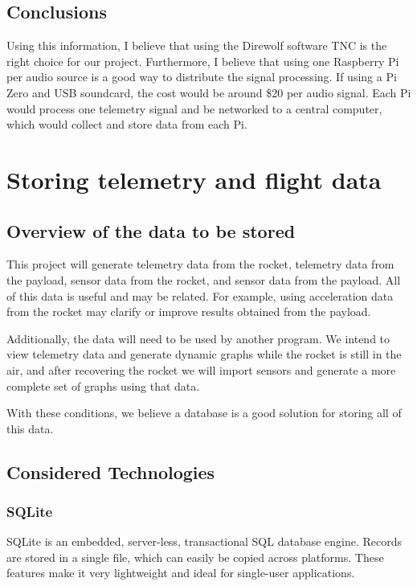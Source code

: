 \documentclass[onecolumn, draftclsnofoot, 10pt, compsoc]{IEEEtran}
\begin{document}
\subsection{Conclusions}
Using this information, I believe that using the Direwolf software TNC is the right choice for our project. Furthermore, I believe that using one Raspberry Pi per audio source is a good way to distribute the signal processing.  If using a Pi Zero and USB soundcard, the cost would be around \$20 per audio signal.  Each Pi would process one telemetry signal and be networked to a central computer, which would collect and store data from each Pi.

\section{Storing telemetry and flight data}

\subsection{Overview of the data to be stored}
This project will generate telemetry data from the rocket, telemetry data from the payload, sensor data from the rocket, and sensor data from the payload.  All of this data is useful and may be related.  For example, using acceleration data from the rocket may clarify or improve results obtained from the payload.

Additionally, the data will need to be used by another program.  We intend to view telemetry data and generate dynamic graphs while the rocket is still in the air, and after recovering the rocket we will import sensors and generate a more complete set of graphs using that data.

With these conditions, we believe a database is a good solution for storing all of this data.

\subsection{Considered Technologies}

\subsubsection{SQLite}
SQLite is an embedded, server-less, transactional SQL database engine.  Records are stored in a single file, which can easily be copied across platforms.  These features make it very lightweight and ideal for single-user applications.
\end{document}
